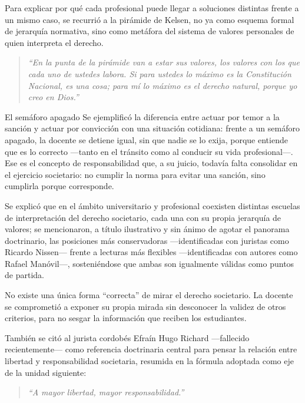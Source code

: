 \documentclass[12pt,oneside]{book}
\begin{document}
Para explicar por qué cada profesional puede llegar a soluciones distintas frente a un mismo caso, se recurrió a la pirámide de Kelsen, no ya como esquema formal de jerarquía normativa, sino como metáfora del sistema de valores personales de quien interpreta el derecho.

\begin{quote}
\textit{``En la punta de la pirámide van a estar sus valores, los valores con los que cada uno de ustedes labora. Si para ustedes lo máximo es la Constitución Nacional, es una cosa; para mí lo máximo es el derecho natural, porque yo creo en Dios.''}
\end{quote}

\begin{example}{El semáforo apagado}
Se ejemplificó la diferencia entre actuar por temor a la sanción y actuar por convicción con una situación cotidiana: frente a un semáforo apagado, la docente se detiene igual, sin que nadie se lo exija, porque entiende que es lo correcto —tanto en el tránsito como al conducir su vida profesional—. Ese es el concepto de responsabilidad que, a su juicio, todavía falta consolidar en el ejercicio societario: no cumplir la norma para evitar una sanción, sino cumplirla porque corresponde.
\end{example}

Se explicó que en el ámbito universitario y profesional coexisten distintas escuelas de interpretación del derecho societario, cada una con su propia jerarquía de valores; se mencionaron, a título ilustrativo y sin ánimo de agotar el panorama doctrinario, las posiciones más conservadoras —identificadas con juristas como Ricardo Nissen— frente a lecturas más flexibles —identificadas con autores como Rafael Manóvil—, sosteniéndose que ambas son igualmente válidas como puntos de partida.

\begin{important}
No existe una única forma ``correcta'' de mirar el derecho societario. La docente se comprometió a exponer su propia mirada sin desconocer la validez de otros criterios, para no sesgar la información que reciben los estudiantes.
\end{important}

También se citó al jurista cordobés Efraín Hugo Richard —fallecido recientemente— como referencia doctrinaria central para pensar la relación entre libertad y responsabilidad societaria, resumida en la fórmula adoptada como eje de la unidad siguiente:

\begin{quote}
\textit{``A mayor libertad, mayor responsabilidad.''}
\end{quote}
\end{document}
